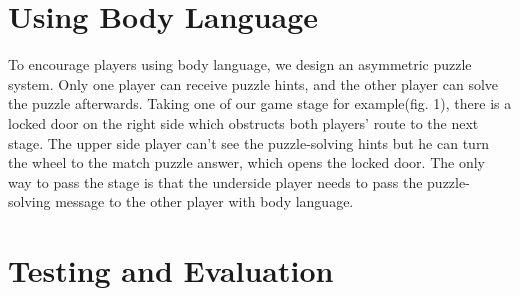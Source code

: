 \documentclass{chi-ext}
\begin{document}
\section{Using Body Language}

To encourage players using body language, we design an asymmetric puzzle system. Only one player can receive puzzle hints, and the other player can solve the puzzle afterwards.
Taking one of our game stage for example(fig. 1), there is a locked door on the right side which obstructs both players' route to the next stage. 
The upper side player can't see the puzzle-solving hints but he can turn the wheel to the match puzzle answer, which opens the locked door.
The only way to pass the stage is that the underside player needs to pass the puzzle-solving message to the other player with body language. 


\section{Testing and Evaluation}
\end{document}
